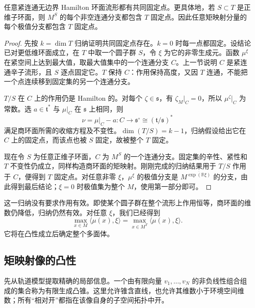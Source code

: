\begin{proposition}\label{g4:prop:1202:fixed-point-induction}
	任意紧连通无边界 Hamilton 环面流形都有共同固定点。更具体地，若 \(S\subset T\) 是正维子环面，则 \(M^S\) 的每个非空连通分支都包含 \(T\) 固定点。因此任意矩映射分量的每个极值分支都包含 \(T\) 固定点。
\end{proposition}
\begin{proof}
	先按 \(k=\dim T\) 归纳证明共同固定点存在。\(k=0\) 时每一点都固定。设结论已对更低维环面成立，在 \(T\) 中取一个圆子群 \(S\)，令 \(\xi\) 为它的非零生成元。函数 \(\mu^\xi\) 在紧空间上达到最大值，取最大值集中的一个连通分支 \(C\)。上一节说明 \(C\) 是紧连通辛子流形，且 \(S\) 逐点固定它。\(T\) 保持 \(C\)：作用保持高度，又因 \(T\) 连通，不能把一个点连续移到固定集的另一个连通分支。

	\(T/S\) 在 \(C\) 上的作用仍是 Hamilton 的。对每个 \(\zeta\in\mathfrak s\)，有 \(\zeta_M|_C=0\)，所以 \(\mu^\zeta|_C\) 为常数。选 \(a\in\mathfrak t^*\) 与 \(\mu|_C\) 在 \(\mathfrak s\) 上相同，则
	\[
		\nu=\mu|_C-a:C\longrightarrow
		\mathfrak s^\circ\cong(\mathfrak t/\mathfrak s)^*
	\]
	满足商环面所需的收缩方程及不变性。\(\dim(T/S)=k-1\)，归纳假设给出它在 \(C\) 上的固定点，而该点也被 \(S\) 固定，故被整个 \(T\) 固定。

	现在令 \(S\) 为任意正维子环面，\(C\) 为 \(M^S\) 的一个连通分支。固定集的辛性、紧性和 \(T\) 不变性仍成立，同样构造商环面的矩映射。刚刚完成的归纳结果用于 \(T/S\) 作用于 \(C\)，便得到 \(T\) 固定点。对任意非零 \(\xi\)，\(\mu^\xi\) 的极值分支是 \(M^{\overline{\exp(\mathbb R\xi)}}\) 的分支，由此得到最后结论；\(\xi=0\) 时极值集为整个 \(M\)，使用第一部分即可。
\end{proof}

这一归纳没有要求作用有效。即使某个圆子群在整个流形上作用恒等，商环面的维数仍降低，归纳仍然有效。对任意 \(\xi\)，我们已经得到
\begin{equation}\label{g4:eq:1202:fixed-support-extreme}
	\max_{x\in M}\langle\mu(x),\xi\rangle
	=\max_{x\in M^T}\langle\mu(x),\xi\rangle.
\end{equation}
它将在凸性成立后确定整个多面体。

\subsection{矩映射像的凸性}
\label{g4:subsec:1202:03}

先从轨道模型提取精确的局部信息。一个由有限向量 \(v_1,\ldots,v_N\) 的非负线性组合组成的集合称为有限生成凸锥。这里允许锥含直线，也允许其维数小于环境空间维数；所有“相对开”都指在该像自身的子空间拓扑中开。

